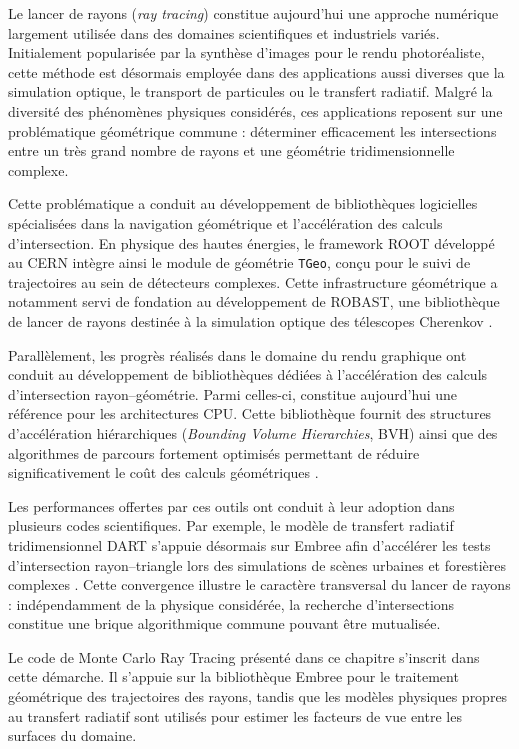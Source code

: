 Le lancer de rayons (\textit{ray tracing}) constitue aujourd'hui une approche numérique largement utilisée dans des domaines scientifiques et industriels variés. Initialement popularisée par la synthèse d'images pour le rendu photoréaliste, cette méthode est désormais employée dans des applications aussi diverses que la simulation optique, le transport de particules ou le transfert radiatif. Malgré la diversité des phénomènes physiques considérés, ces applications reposent sur une problématique géométrique commune : déterminer efficacement les intersections entre un très grand nombre de rayons et une géométrie tridimensionnelle complexe.

Cette problématique a conduit au développement de bibliothèques logicielles spécialisées dans la navigation géométrique et l'accélération des calculs d'intersection. En physique des hautes énergies, le framework \textsc{ROOT} développé au CERN intègre ainsi le module de géométrie \texttt{TGeo}, conçu pour le suivi de trajectoires au sein de détecteurs complexes. Cette infrastructure géométrique a notamment servi de fondation au développement de \textsc{ROBAST}, une bibliothèque de lancer de rayons destinée à la simulation optique des télescopes Cherenkov \cite{Brun1997ROOT,Okumura2016}.

Parallèlement, les progrès réalisés dans le domaine du rendu graphique ont conduit au développement de bibliothèques dédiées à l'accélération des calculs d'intersection rayon--géométrie. Parmi celles-ci, \emb constitue aujourd'hui une référence pour les architectures CPU. Cette bibliothèque fournit des structures d'accélération hiérarchiques (\textit{Bounding Volume Hierarchies}, BVH) ainsi que des algorithmes de parcours fortement optimisés permettant de réduire significativement le coût des calculs géométriques \cite{Wald2014Embree}.

Les performances offertes par ces outils ont conduit à leur adoption dans plusieurs codes scientifiques. Par exemple, le modèle de transfert radiatif tridimensionnel \textsc{DART} s'appuie désormais sur Embree afin d'accélérer les tests d'intersection rayon--triangle lors des simulations de scènes urbaines et forestières complexes \cite{Qi2019HybridScene}. Cette convergence illustre le caractère transversal du lancer de rayons : indépendamment de la physique considérée, la recherche d'intersections constitue une brique algorithmique commune pouvant être mutualisée.

Le code de Monte Carlo Ray Tracing présenté dans ce chapitre s'inscrit dans cette démarche. Il s'appuie sur la bibliothèque Embree pour le traitement géométrique des trajectoires des rayons, tandis que les modèles physiques propres au transfert radiatif sont utilisés pour estimer les facteurs de vue entre les surfaces du domaine.